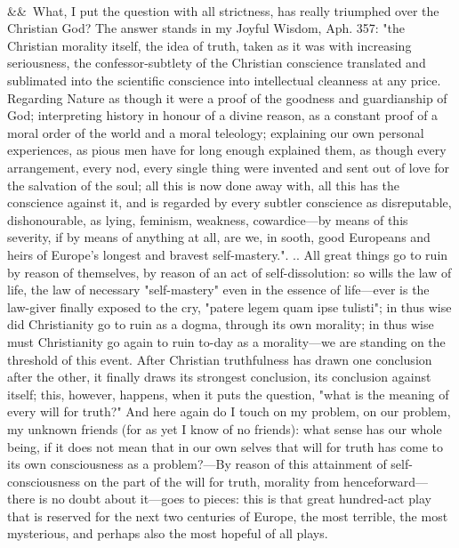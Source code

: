 \documentclass[12pt]{article}
\newcommand{\para}[1][]{\par\noindent\ifx&#1&\else\textsuperscript{\footnotesize #1}~\fi}
\begin{document}
\para What, I put the question with all strictness, has really triumphed over the Christian God? The answer stands in my Joyful Wisdom, Aph. 357: "the Christian morality itself, the idea of truth, taken as it was with increasing seriousness, the confessor-subtlety of the Christian conscience translated and sublimated into the scientific conscience into intellectual cleanness at any price. Regarding Nature as though it were a proof of the goodness and guardianship of God; interpreting history in honour of a divine reason, as a constant proof of a moral order of the world and a moral teleology; explaining our own personal experiences, as pious men have for long enough explained them, as though every arrangement, every nod, every single thing were invented and sent out of love for the salvation of the soul; all this is now done away with, all this has the conscience against it, and is regarded by every subtler conscience as disreputable, dishonourable, as lying, feminism, weakness, cowardice---by means of this severity, if by means of anything at all, are we, in sooth, good Europeans and heirs of Europe's longest and bravest self-mastery.". .. All great things go to ruin by reason of themselves, by reason of an act of self-dissolution: so wills the law of life, the law of necessary "self-mastery" even in the essence of life---ever is the law-giver finally exposed to the cry, "patere legem quam ipse tulisti"; in thus wise did Christianity go to ruin as a dogma, through its own morality; in thus wise must Christianity go again to ruin to-day as a morality---we are standing on the threshold of this event. After Christian truthfulness has drawn one conclusion after the other, it finally draws its strongest conclusion, its conclusion against itself; this, however, happens, when it puts the question, "what is the meaning of every will for truth?" And here again do I touch on my problem, on our problem, my unknown friends (for as yet I know of no friends): what sense has our whole being, if it does not mean that in our own selves that will for truth has come to its own consciousness as a problem?---By reason of this attainment of self-consciousness on the part of the will for truth, morality from henceforward---there is no doubt about it---goes to pieces: this is that great hundred-act play that is reserved for the next two centuries of Europe, the most terrible, the most mysterious, and perhaps also the most hopeful of all plays.
\end{document}
